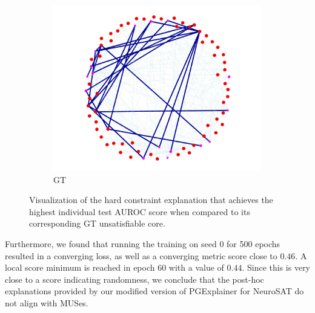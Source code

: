 \begin{figure}[h]
\begin{subfigure}[b]{0.3\textwidth}
        \label{fig:hard_shared}
    \end{subfigure}
    \begin{subfigure}[b]{0.3\textwidth}
        \includegraphics[width=\linewidth]{img/SAT-hard/2025-05-14 20_53_57-seed0_highestAUC_gt_TEST.html.png}
        \caption{\ac{GT}}
        \label{fig:hard_gt}
    \end{subfigure}
    \caption[Visualization of the best hard constraint explanation]{Visualization of the hard constraint explanation that achieves the highest individual test AUROC score when compared to its corresponding \ac{GT} unsatisfiable core.}
    \label{fig:hard_quant}
\end{figure}

Furthermore, we found that running the training on seed 0 for 500 epochs resulted in a converging loss, as well as a converging metric score close to $0.46$. A local score minimum is reached in epoch 60 with a value of $0.44$. Since this is very close to a score indicating randomness, we conclude that the post-hoc explanations provided by our modified version of PGExplainer for NeuroSAT do not align with MUSes.
